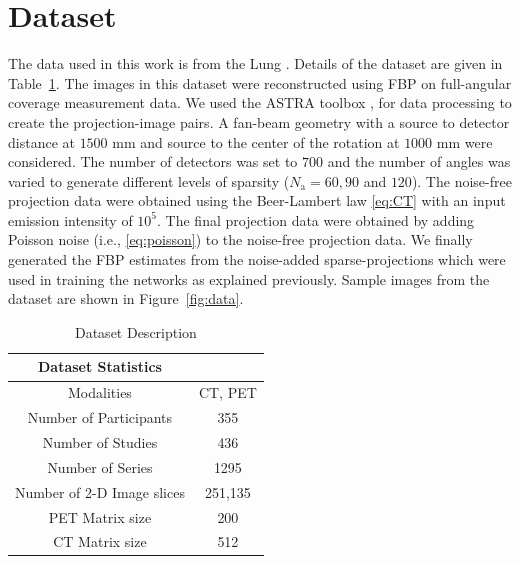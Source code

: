 \section{Dataset}
The data used in this work is from the \ac{Lung} \cite{Lung20,clark2013cancer}. Details of the dataset are given in Table~\ref{table:2a}. The images in this dataset were reconstructed using \ac{FBP} on full-angular coverage measurement data. We used the ASTRA toolbox \cite{van2016fast}, for data processing to create the projection-image pairs.  A fan-beam geometry with a source to detector distance at $1500$ mm and source to the center of the rotation at $1000$ mm were considered. The number of detectors was set to $700$ and the number of angles was varied to generate different levels of sparsity ($N_\mathrm{a}=60,90$ and $120$). The noise-free projection data were obtained using the Beer-Lambert law \eqref{eq:CT} with an input emission intensity of $10^5$. The final projection data were obtained by adding Poisson noise (i.e., \eqref{eq:poisson}) to the noise-free projection data. We finally generated the \ac{FBP} estimates from the noise-added sparse-projections which were used in training the networks as explained previously. Sample images from the dataset are shown in Figure~\ref{fig:data}. 



\begin{table}[ht!]
	\caption{Dataset Description}
	\label{table:2a}
	\centering
	\begin{tabular}{||c|c||} 
		\hline
		Dataset Statistics &  \\ [0.5ex] 
		\hline
		Modalities & CT, PET   \\ 
		\hline
		Number of Participants  & 355  \\
		\hline
		Number of Studies  & 436  \\
		\hline
		Number of Series & 1295 \\ 
		\hline
		Number of 2-D Image slices & 251,135 \\ 
		\hline
		PET Matrix size & 200 \\ 
		\hline
		CT Matrix size & 512 \\ 
		\hline
		
	\end{tabular}
	
\end{table}

